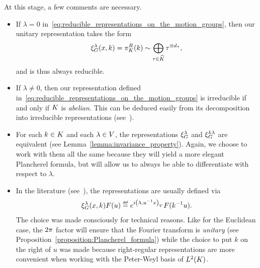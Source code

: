 At this stage,
a few comments are necessary.

\begin{itemize}
    \item
        If $\lambda = 0$ in~\eqref{eq:reducible_representations_on_the_motion_groups},
        then our unitary representation takes the form
        \begin{align*}
            \xi^{\lambda}_{G}(x, k) = \pi^R_{K}(k)
            \sim \bigoplus_{\tau \in {\widehat{K}}} \tau^{\otimes {d_{\tau}}},
        \end{align*}
        and is thus always reducible.
    \item
        If $\lambda \neq 0$,
        then our representation defined in~\eqref{eq:reducible_representations_on_the_motion_groups} is irreducible if and only if $K$ is \emph{abelian}.
        This can be deduced easily from its decomposition into irreducible representations (see~\cite{Kumahara73}).
    \item
        For each $k \in K$ and each $\lambda \in V$,
        the representations $\xi^{\lambda}_{G}$ and $\xi^{k \lambda}_{G}$
        are equivalent (see Lemma~\ref{lemma:invariance_property}).
        Again,
        we choose to work with them all the same
        because they will yield a more elegant Plancherel formula,
        but will allow us to always be able to differentiate with respect to $\lambda$.
    \item
        In the literature (see~\cite{Ito52,Kumahara73,Kumahara76,Vilenkin95}),
        the representations are usually defined via
        \begin{align*}
            \Rep{\lambda} (x, k) F(u) \defeq \e^{\i \ip \lambda {u^{-1} x}} F(k^{-1} u).
        \end{align*}
        The choice was made consciously for technical reasons.
        Like for the Euclidean case, the $2 \pi$ factor will ensure that the Fourier transform is \emph{unitary}
        (see Proposition~\ref{proposition:Plancherel_formula})
        while the choice to put $k$ on the right of $u$
        was made because right-regular representations are more convenient when working with the Peter-Weyl basis of ${L^{2} (K)}$.
\end{itemize}


